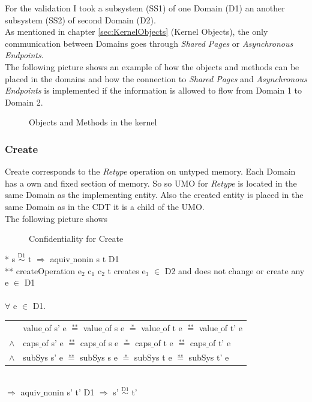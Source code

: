 \documentclass[pdftex,11pt,a4paper]{article}
\begin{document}
For the validation I took a subsystem (SS1) of one Domain (D1) an another subsystem (SS2) of second Domain (D2). \\
As mentioned in chapter \ref{sec:KernelObjects} (Kernel Objects), the only communication between Domains goes through \textit{Shared Pages} or \textit{Asynchronous Endpoints}. \\
The following picture shows an example of how the objects and methods can be placed in the domains and how the connection to \textit{Shared Pages} and \textit{Asynchronous Endpoints} is implemented if the information is allowed to flow from Domain 1 to Domain 2.
\begin{figure}[H]
\caption{Objects and Methods in the kernel}
\end{figure}
\subsubsection{Create}\label{sec:Create}
Create corresponds to the \textit{Retype} operation on untyped memory. Each Domain has a own and fixed section of memory. So so UMO for \textit{Retype} is located in the same Domain as the implementing entity. Also the created entity is placed in the same Domain as in the CDT it is a child of the UMO.  \\
The following picture shows 
\begin{flushleft}
\begin{figure}[H]
\caption{Confidentiality for Create}
\end{figure}
\end{flushleft}
* s $\overset{\text{D1}}{\sim}$ t $\Rightarrow$ aquiv$\_$nonin s t D1	\\ 
** createOperation e$_2$ c$_1$ c$_2$ t creates e$_3$ $\in$ D2 and does not change or create any e $\in$ D1 \\ \\
$\forall$ e $\in$ D1. \\ 
\begin{tabular}{ll}
& value$\_$of s' e $\overset{\text{**}}{=}$ value$\_$of s e $\overset{\text{*}}{=}$ value$\_$of t e $\overset{\text{**}}{=}$ value$\_$of t' e \\
$\wedge$ & caps$\_$of s' e $\overset{\text{**}}{=}$ caps$\_$of s e $\overset{\text{*}}{=}$ caps$\_$of t e $\overset{\text{**}}{=}$ caps$\_$of t' e \\
$\wedge$ & subSys s' e $\overset{\text{**}}{=}$ subSys s e $\overset{\text{*}}{=}$ subSys t e $\overset{\text{**}}{=}$ subSys t' e
\end{tabular} \\
$\Rightarrow$ aquiv$\_$nonin s' t' D1 $\Rightarrow$ s' $\overset{\text{D1}}{\sim}$ t' \\ \\
\end{document}

